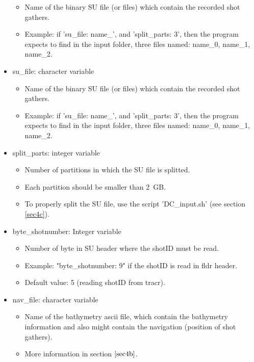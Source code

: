 \documentclass[11pt, oneside]{article}   	%
\begin{document}
\begin{itemize}
	\begin{itemize}
	\item Name of the binary SU file (or files) which contain the recorded shot gathers.
	\item Example: if 'su\_file: name\_', and 'split\_parts: 3', then the program expects to find in the input folder, three files named: name\_0, 	name\_1, name\_2.
	\end{itemize}
	
\item su\_{file}: character variable 
	\begin{itemize}
	\item Name of the binary SU file (or files) which contain the recorded shot gathers.
	\item Example: if 'su\_file: name\_', and 'split\_parts: 3', then the program expects to find in the input folder, three files named: name\_0, 	name\_1, name\_2.
	\end{itemize}

\item split\_{parts}: integer variable 
	\begin{itemize}
	\item Number of partitions in which the SU file is splitted.
	\item Each partition should be smaller than 2~GB. 
	\item To properly split the SU file, use the script 'DC\_input.sh' (see section \ref{sec4c}).
	\end{itemize}
	
\item {byte\_shotnumber:} Integer variable
	\begin{itemize}
	\item  Number of byte in SU header where the shotID must be read. 
	\item Example: "byte\_shotnumber: 9" if the shotID is read in fldr header.
	\item Default value: 5 (reading shotID from tracr).
	\end{itemize}

\item nav\_{file}: character variable
	\begin{itemize}
	\item Name of the bathymetry ascii file, which contain the bathymetry information and also might contain the navigation (position of shot gathers).
	\item More information in section $\ref{sec4b}$.
	\end{itemize}


\end{itemize}
\end{document}
